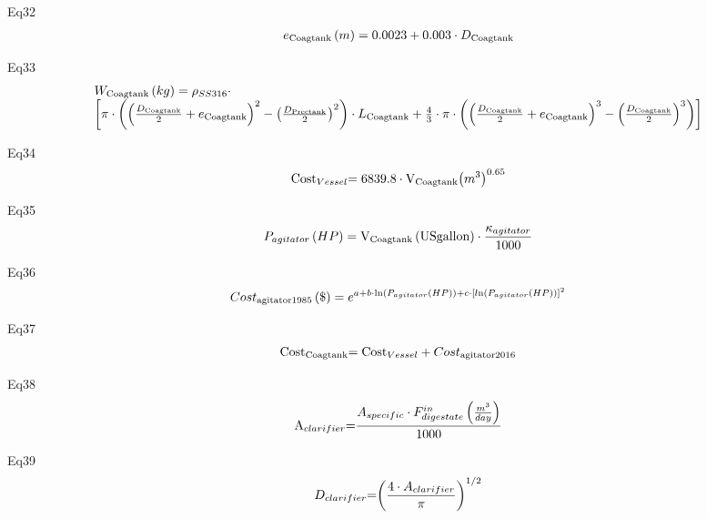 \documentclass[10pt,a4paper]{article}
\begin{document}
Eq32
\begin{align}
	{e_{{\rm{Coag tank}}}}\left( m \right) = 0.0023 + 0.003\cdot{D_{{\rm{Coag tank}}}}
\end{align}

Eq33
\begin{align}
	\begin{array}{l}{W_{{\rm{Coag tank}}}}\left( {kg} \right) = {\rho _{SS316}}\cdot\\\left[ {\pi \cdot\left( {{{\left( {\frac{{{D_{{\rm{Coag tank}}}}}}{2} + {e_{{\rm{Coag tank}}}}} \right)}^2} - {{\left( {\frac{{{D_{{\rm{Prec tank}}}}}}{2}} \right)}^2}} \right)\cdot{L_{{\rm{Coag tank}}}} + \frac{4}{3}\cdot\pi \cdot\left( {{{\left( {\frac{{{D_{{\rm{Coag tank}}}}}}{2} + {e_{{\rm{Coag tank}}}}} \right)}^3} - {{\left( {\frac{{{D_{{\rm{Coag tank}}}}}}{2}} \right)}^3}} \right)} \right]\end{array}
\end{align}

Eq34
\begin{align}
	{\rm{Cos}}{{\rm{t}}_{Vessel}}{\rm{ = 6839}}{\rm{.8}} \cdot {{\rm{V}}_{{\rm{Coag tank}}}}{\left( {{m^3}} \right)^{0.65}}
\end{align}

Eq35
\begin{align}
	{P_{agitator}}\left( {HP} \right) = {{\rm{V}}_{{\rm{Coag tank}}}}\left( {{\rm{US gallon}}} \right) \cdot \frac{{{\kappa _{agitator}}}}{{1000}}
\end{align}

Eq36
\begin{align}
	Cos{t_{{\rm{agitator 1985}}}}\left( \$  \right) = {e^{a + b \cdot {\rm{ln}}\left( {{P_{agitator}}\left( {HP} \right)} \right) + c \cdot {{\left[ {l{\rm{n}}\left( {{P_{agitator}}\left( {HP} \right)} \right)} \right]}^2}}}
\end{align}

Eq37
\begin{align}
	{\rm{Cos}}{{\rm{t}}_{{\rm{Coag tank}}}}{\rm{ = Cos}}{{\rm{t}}_{Vessel}} + Cos{t_{{\rm{agitator 2016}}}}
\end{align}

Eq38
\begin{align}
	{{\rm{A}}_{clarifier}}{\rm{ = }}\frac{{{A_{specific}} \cdot F_{digestate}^{in}\left( {\frac{{{m^3}}}{{day}}} \right)}}{{1000}}
\end{align}

Eq39
\begin{align}
	{D_{clarifier}}{\rm{ = }}{\left( {\frac{{4 \cdot {A_{clarifier}}}}{\pi }} \right)^{1/2}}
\end{align}
\end{document}
